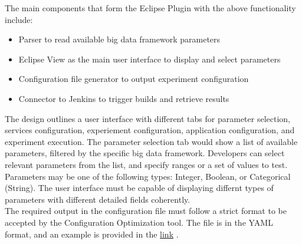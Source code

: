 The main components that form the Eclipse Plugin with the above functionality include:
\begin{itemize}
\item Parser to read available big data framework parameters
\item Eclipse View as the main user interface to display and select parameters
\item Configuration file generator to output experiment configuration
\item Connector to Jenkins to trigger builds and retrieve results
\end{itemize}
The design outlines a user interface with different tabs for parameter selection, services configuration, experiement configuration, application configuration, and experiment execution. The parameter selection tab would show a list of available parameters, filtered by the specific big data framework. Developers can select relevant parameters from the list, and specify ranges or a set of values to test.\\
Parameters may be one of the following types: Integer, Boolean, or Categorical (String). The user interface must be capable of displaying differnt types of parameters with different detailed fields coherently.\\
The required output in the configuration file must follow a strict format to be accepted by the Configuration Optimization tool. The file is in the YAML format, and an example is provided in the \href{https://github.com/dice-project/DICE-Configuration-BO4CO/blob/master/src/conf/expconfig.yaml}{link} \cite{yaml}.

\newpage
